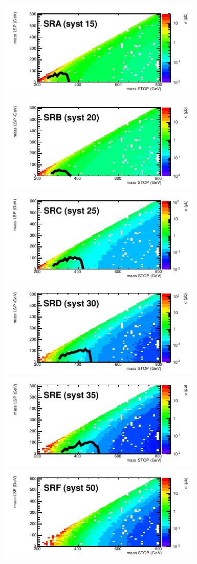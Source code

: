 \begin{figure}[hbt]
  \begin{center}
        \includegraphics[width=0.5\linewidth]{plots/stopPlot/masses_SRA_xsecP.pdf}%
        \includegraphics[width=0.5\linewidth]{plots/stopPlot/masses_SRB_xsecP.pdf}
        \includegraphics[width=0.5\linewidth]{plots/stopPlot/masses_SRC_xsecP.pdf}%
        \includegraphics[width=0.5\linewidth]{plots/stopPlot/masses_SRD_xsecP.pdf}
        \includegraphics[width=0.5\linewidth]{plots/stopPlot/masses_SRE_xsecP.pdf}%
        \includegraphics[width=0.5\linewidth]{plots/stopPlot/masses_SRF_xsecP.pdf}

\end{center}
\end{figure}
